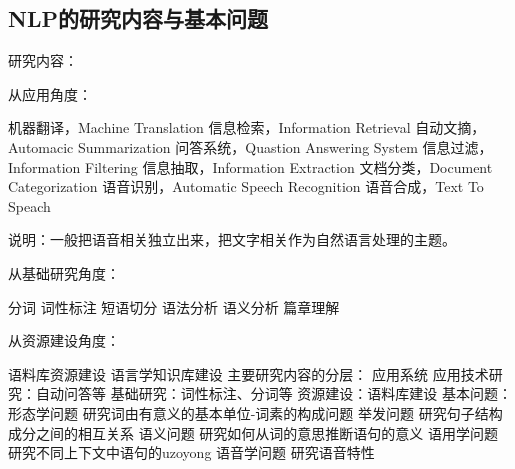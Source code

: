 \documentclass{ctexart}
\begin{document}
\subsection{NLP的研究内容与基本问题}
\begin{outline}
    \1 研究内容：

        从应用角度：

        \2 机器翻译，Machine Translation
        \2 信息检索，Information Retrieval
        \2 自动文摘，Automacic Summarization
        \2 问答系统，Quastion Answering System
        \2 信息过滤，Information Filtering
        \2 信息抽取，Information Extraction
        \2 文档分类，Document Categorization
        \2 语音识别，Automatic Speech Recognition
        \2 语音合成，Text To Speach

        \2 说明：一般把语音相关独立出来，把文字相关作为自然语言处理的主题。
    
        从基础研究角度：
        
        \2 分词
        \2 词性标注
        \2 短语切分
        \2 语法分析
        \2 语义分析
        \2 篇章理解

        从资源建设角度：

        \2 语料库资源建设
        \2 语言学知识库建设
    \1 主要研究内容的分层：
        \2 应用系统
        \2 应用技术研究：自动问答等
        \2 基础研究：词性标注、分词等
        \2 资源建设：语料库建设
    \1 基本问题：
        \2 形态学问题
            \3 研究词由有意义的基本单位-词素的构成问题
        \2 举发问题
            \3 研究句子结构成分之间的相互关系
        \2 语义问题
            \3 研究如何从词的意思推断语句的意义
        \2 语用学问题
            \3 研究不同上下文中语句的uzoyong
        \2 语音学问题
            \3 研究语音特性
\end{outline}
\end{document}
